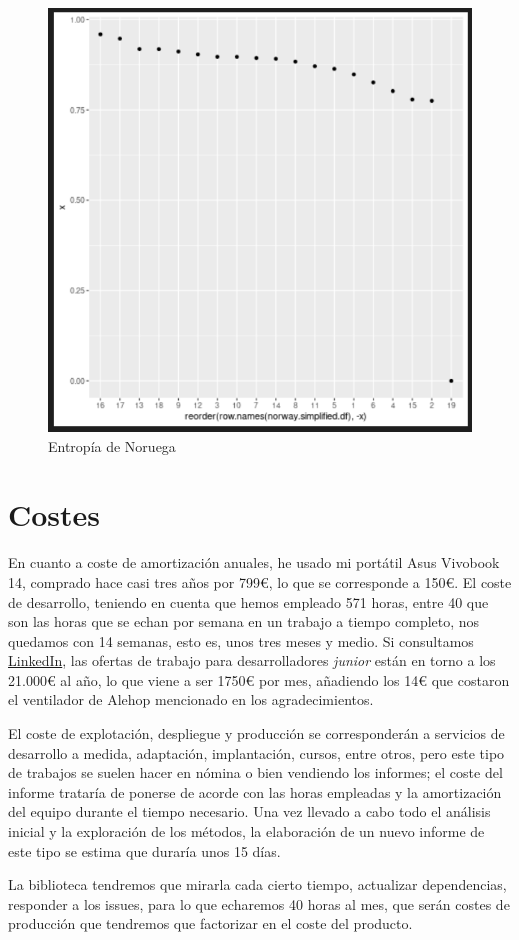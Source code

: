 \begin{figure}[h!]
    \centering
     \includegraphics[width=\textwidth]{./img/norwayentrop.png}
     \caption{Entropía de Noruega}
     \label{img:red:eng:nor}
\end{figure}


\section{Costes}


En cuanto a coste de amortización anuales, he usado mi portátil Asus Vivobook 14, comprado hace casi tres 
años por 799€, lo que se corresponde a 150€. El coste de desarrollo, teniendo en cuenta que 
hemos empleado 571 horas, entre 40 que son las horas que se echan por semana en un trabajo a 
tiempo completo, nos quedamos con 14 semanas, esto es, unos tres meses y medio. Si consultamos 
\href{https://www.linkedin.com/feed/}{LinkedIn}, las ofertas de trabajo para desarrolladores 
\textit{junior} están en torno a los 21.000€ al año, lo que viene a ser 1750€ por mes, añadiendo los 14€ 
que costaron el ventilador de Alehop mencionado en los agradecimientos.

El coste de explotación, despliegue y producción se corresponderán a servicios de 
desarrollo a medida, adaptación, implantación, cursos, entre otros, pero este
tipo de trabajos se suelen hacer en nómina o bien vendiendo los informes; el
coste del informe trataría de ponerse de acorde con las horas empleadas y la
amortización del equipo durante el tiempo necesario. Una vez llevado a cabo todo
el análisis inicial y la exploración de los métodos, la elaboración de un nuevo
informe de este tipo se estima que duraría unos 15 días.

La biblioteca tendremos que 
mirarla cada cierto tiempo, actualizar dependencias, responder a los issues, para lo que echaremos 
40 horas al mes, que serán costes de producción que tendremos que factorizar en el coste del producto.
